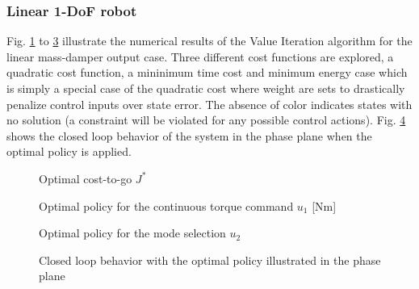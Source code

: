 \subsubsection{Linear 1-DoF robot}
Fig. \ref{fig:J} to \ref{fig:u1} illustrate the numerical results of the Value Iteration algorithm for the linear mass-damper output case. Three different cost functions are explored, a quadratic cost function, a mininimum time cost and minimum energy case which is simply a special case of the quadratic cost where weight are sets to drastically penalize control inputs over state error. The absence of color indicates states with no solution (a constraint will be violated for any possible control actions). Fig. \ref{fig:phase_plane} shows the closed loop behavior of the system in the phase plane when the optimal policy is applied.
%
\begin{figure}[H]
        \centering
        \caption{Optimal cost-to-go $J^*$}\label{fig:J}
\end{figure}
%
\begin{figure}[H]
        \centering
        \caption{Optimal policy for the continuous torque command $u_1$ [Nm]}\label{fig:u0}
\end{figure}
%
\begin{figure}[H]
        \centering
        \caption{Optimal policy for the mode selection $u_2$}\label{fig:u1}
\end{figure}
%
\begin{figure}[H]
        \centering
        \caption[Closed loop behavior in the phase plane]{Closed loop behavior with the optimal policy illustrated in the phase plane}\label{fig:phase_plane}
\end{figure}

